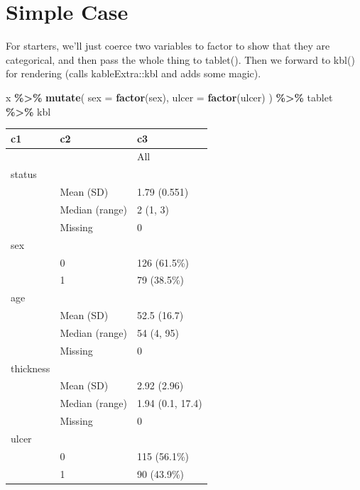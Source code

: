 \documentclass[
]{article}
\newenvironment{Shaded}{\begin{snugshade}}{\end{snugshade}}
\newcommand{\AttributeTok}[1]{\textcolor[rgb]{0.13,0.29,0.53}{#1}}
\newcommand{\FunctionTok}[1]{\textcolor[rgb]{0.13,0.29,0.53}{\textbf{#1}}}
\newcommand{\NormalTok}[1]{#1}
\newcommand{\SpecialCharTok}[1]{\textcolor[rgb]{0.81,0.36,0.00}{\textbf{#1}}}
\begin{document}
\section{Simple Case}\label{simple-case}

For starters, we'll just coerce two variables to factor to show that
they are categorical, and then pass the whole thing to tablet(). Then we
forward to kbl() for rendering (calls kableExtra::kbl and adds some
magic).

\begin{Shaded}
\begin{Highlighting}[]
\NormalTok{x }\SpecialCharTok{\%\textgreater{}\%}
  \FunctionTok{mutate}\NormalTok{(}
    \AttributeTok{sex =} \FunctionTok{factor}\NormalTok{(sex), }
    \AttributeTok{ulcer =} \FunctionTok{factor}\NormalTok{(ulcer)}
\NormalTok{  ) }\SpecialCharTok{\%\textgreater{}\%}
\NormalTok{  tablet }\SpecialCharTok{\%\textgreater{}\%}
\NormalTok{  kbl}
\end{Highlighting}
\end{Shaded}

\begin{tabular}[t]{l|l|l}
\hline
c1 & c2 & c3\\
\hline
 &  & All\\
\hline
status &  & \\
\hline
 & Mean (SD) & 1.79 (0.551)\\
\hline
 & Median (range) & 2 (1, 3)\\
\hline
 & Missing & 0\\
\hline
sex &  & \\
\hline
 & 0 & 126 (61.5\%)\\
\hline
 & 1 & 79 (38.5\%)\\
\hline
age &  & \\
\hline
 & Mean (SD) & 52.5 (16.7)\\
\hline
 & Median (range) & 54 (4, 95)\\
\hline
 & Missing & 0\\
\hline
thickness &  & \\
\hline
 & Mean (SD) & 2.92 (2.96)\\
\hline
 & Median (range) & 1.94 (0.1, 17.4)\\
\hline
 & Missing & 0\\
\hline
ulcer &  & \\
\hline
 & 0 & 115 (56.1\%)\\
\hline
 & 1 & 90 (43.9\%)\\
\hline
\end{tabular}
\end{document}
